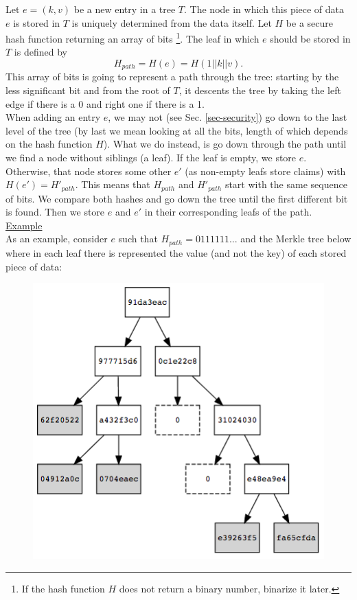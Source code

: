 \documentclass{article}
\begin{document}
\begin{spacing}{1.2}
Let $e=(k,v)$ be a new entry in a tree $T$. The node in which this piece of data $e$ is stored in $T$ is uniquely determined from the data itself. Let $H$ be a secure hash function returning an array of bits \footnote{If the hash function $H$ does not return a binary number, binarize it later.}. The leaf in which $e$ should be stored in $T$ is defined by 
$$H_{path} = H(e) = H(1 || k || v).$$ 
This array of bits is going to represent a path through the tree: starting by the less significant bit and from the root of $T$, it descents the tree by taking the left edge if there is a 0 and right one if there is a 1.\\

When adding an entry $e$, we may not (see Sec. \ref{sec-security}) go down to the last level of the tree (by last we mean looking at all the bits, length of which depends on the hash function $H$). What we do instead, is go down through the path until we find a node without siblings (a leaf). 
%
If the leaf is empty, we store $e$. Otherwise, that node stores some other $e'$ (as non-empty leafs store claims) with $H(e') = H'_{path}$. This means that $H_{path}$ and $H'_{path}$ start with the same sequence of bits. 
%
We compare both hashes and go down the tree until the first different bit is found. %
Then we store $e$ and $e'$ in their corresponding leafs of the path.\\
%

{\underline{Example}}\\ 

As an example, consider $e$ such that $H_{path}=0111111...$ and the Merkle tree below where in each leaf there is represented the value (and not the key) of each stored piece of data:

\begin{figure}[h]
	\centering
	\includegraphics[scale=0.5]{../../figures/ex-MT-5.png}
\end{figure}


\end{spacing}
\end{document}
